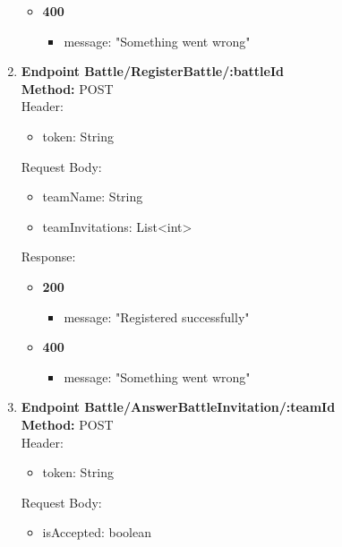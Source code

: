 \begin{enumerate}
\begin{itemize}
        \item \textbf{400} \\
        \begin{itemize}
            \item message: "Something went wrong"
        \end{itemize}
    \end{itemize}
    \item \textbf{Endpoint Battle/RegisterBattle/:battleId} \\
    \textbf{Method:} POST \\
    Header:\\
    \begin{itemize}
        \item token: String
    \end{itemize}
    Request Body:\\
    \begin{itemize}
        \item teamName: String
        \item teamInvitations: List<int>
    \end{itemize}
    Response:\\
    \begin{itemize}
        \item \textbf{200} \\
        \begin{itemize}
            \item message: "Registered successfully"
        \end{itemize}
        \item \textbf{400} \\
        \begin{itemize}
            \item message: "Something went wrong"
        \end{itemize}
    \end{itemize}
    \item \textbf{Endpoint Battle/AnswerBattleInvitation/:teamId} \\
    \textbf{Method:} POST \\
    Header:\\
    \begin{itemize}
        \item token: String
    \end{itemize}
    Request Body:\\
    \begin{itemize}
        \item isAccepted: boolean

\end{itemize}
\end{enumerate}
